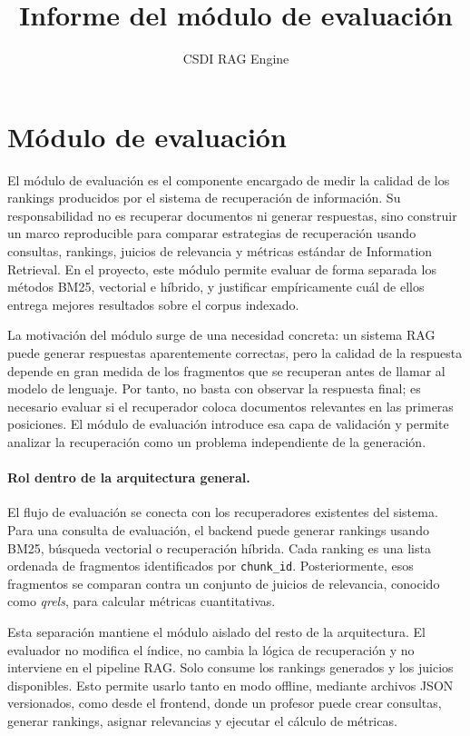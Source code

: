 \documentclass[11pt]{article}
\title{Informe del módulo de evaluación}
\author{CSDI RAG Engine}
\date{}
\begin{document}
\maketitle

\section{Módulo de evaluación}

El módulo de evaluación es el componente encargado de medir la calidad de los rankings producidos por el sistema de recuperación de información. Su responsabilidad no es recuperar documentos ni generar respuestas, sino construir un marco reproducible para comparar estrategias de recuperación usando consultas, rankings, juicios de relevancia y métricas estándar de Information Retrieval. En el proyecto, este módulo permite evaluar de forma separada los métodos BM25, vectorial e híbrido, y justificar empíricamente cuál de ellos entrega mejores resultados sobre el corpus indexado.

La motivación del módulo surge de una necesidad concreta: un sistema RAG puede generar respuestas aparentemente correctas, pero la calidad de la respuesta depende en gran medida de los fragmentos que se recuperan antes de llamar al modelo de lenguaje. Por tanto, no basta con observar la respuesta final; es necesario evaluar si el recuperador coloca documentos relevantes en las primeras posiciones. El módulo de evaluación introduce esa capa de validación y permite analizar la recuperación como un problema independiente de la generación.

\paragraph{Rol dentro de la arquitectura general.}
El flujo de evaluación se conecta con los recuperadores existentes del sistema. Para una consulta de evaluación, el backend puede generar rankings usando BM25, búsqueda vectorial o recuperación híbrida. Cada ranking es una lista ordenada de fragmentos identificados por \texttt{chunk\_id}. Posteriormente, esos fragmentos se comparan contra un conjunto de juicios de relevancia, conocido como \emph{qrels}, para calcular métricas cuantitativas.

Esta separación mantiene el módulo aislado del resto de la arquitectura. El evaluador no modifica el índice, no cambia la lógica de recuperación y no interviene en el pipeline RAG. Solo consume los rankings generados y los juicios disponibles. Esto permite usarlo tanto en modo offline, mediante archivos JSON versionados, como desde el frontend, donde un profesor puede crear consultas, generar rankings, asignar relevancias y ejecutar el cálculo de métricas.
\end{document}
